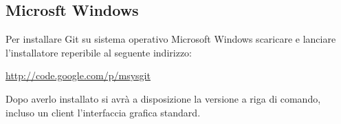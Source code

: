 \subsection{Microsft Windows}
Per installare Git su sistema operativo Microsoft Windows scaricare e lanciare l'installatore reperibile al seguente indirizzo:

\url{http://code.google.com/p/msysgit}

Dopo averlo installato si avrà a disposizione la versione a riga di comando, incluso un client l'interfaccia grafica standard.